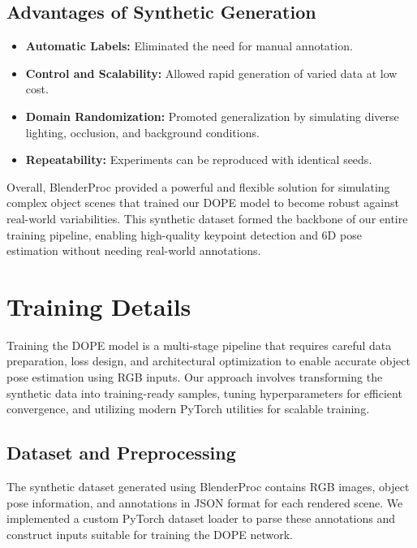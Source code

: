 \documentclass[conference]{IEEEtran}
\begin{document}
\subsection{Advantages of Synthetic Generation}

\begin{itemize}
\item \textbf{Automatic Labels:} Eliminated the need for manual annotation.
\item \textbf{Control and Scalability:} Allowed rapid generation of varied data at low cost.
\item \textbf{Domain Randomization:} Promoted generalization by simulating diverse lighting, occlusion, and background conditions.
\item \textbf{Repeatability:} Experiments can be reproduced with identical seeds.
\end{itemize}

Overall, BlenderProc provided a powerful and flexible solution for simulating complex object scenes that trained our DOPE model to become robust against real-world variabilities. This synthetic dataset formed the backbone of our entire training pipeline, enabling high-quality keypoint detection and 6D pose estimation without needing real-world annotations.

\section{Training Details}
Training the DOPE model is a multi-stage pipeline that requires careful data preparation, loss design, and architectural optimization to enable accurate object pose estimation using RGB inputs. Our approach involves transforming the synthetic data into training-ready samples, tuning hyperparameters for efficient convergence, and utilizing modern PyTorch utilities for scalable training.

\subsection{Dataset and Preprocessing}

The synthetic dataset generated using BlenderProc contains RGB images, object pose information, and annotations in JSON format for each rendered scene. We implemented a custom PyTorch dataset loader to parse these annotations and construct inputs suitable for training the DOPE network.
\end{document}
